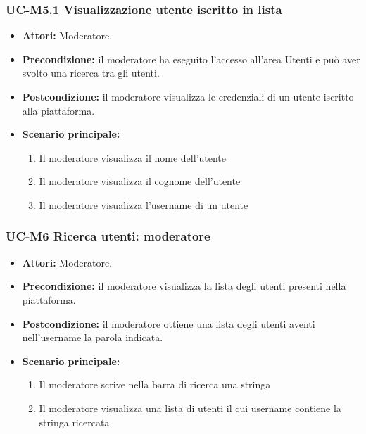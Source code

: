 \subsubsection{UC-M5.1 Visualizzazione utente iscritto in lista}
	\begin{itemize}
		\item \textbf{Attori:} Moderatore.
		\item \textbf{Precondizione:} il moderatore ha eseguito l'accesso all'area Utenti e può aver svolto una ricerca tra gli utenti.
		\item \textbf{Postcondizione:} il moderatore visualizza le credenziali di un utente iscritto alla piattaforma.
		\item \textbf{Scenario principale:}
			\begin{enumerate}
				\item Il moderatore visualizza il nome dell'utente
				\item Il moderatore visualizza il cognome dell'utente
				\item Il moderatore visualizza l'username di un utente
			\end{enumerate}
	\end{itemize}
		
\subsubsection{UC-M6 Ricerca utenti: moderatore}
	\begin{itemize}
		\item \textbf{Attori:} Moderatore.
		\item \textbf{Precondizione:} il moderatore visualizza la lista degli utenti presenti nella piattaforma.
		\item \textbf{Postcondizione:} il moderatore ottiene una lista degli utenti aventi nell'username la parola indicata.
		\item \textbf{Scenario principale:}
			\begin{enumerate}
				\item Il moderatore scrive nella barra di ricerca una stringa
				\item Il moderatore visualizza una lista di utenti il cui username contiene la stringa ricercata
			\end{enumerate}
	\end{itemize}
	
